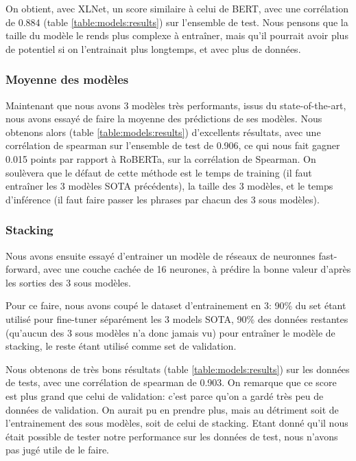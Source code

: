 \documentclass[11pt,a4paper, french]{article}
\begin{document}
On obtient, avec XLNet, un score similaire à celui de BERT, avec une corrélation de 0.884 (table \ref{table:models:results}) sur l'ensemble de test. Nous pensons que la taille du modèle le rends plus complexe à entraîner, mais qu'il pourrait avoir plus de potentiel si on l'entrainait plus longtemps, et avec plus de données.

%
\subsubsection{Moyenne des modèles}

Maintenant que nous avons 3 modèles très performants, issus du state-of-the-art, nous avons essayé de faire la moyenne des prédictions de ses modèles. Nous obtenons alors (table \ref{table:models:results}) d'excellents résultats, avec une corrélation de spearman sur l'ensemble de test de 0.906, ce qui nous fait gagner 0.015 points par rapport à RoBERTa, sur la corrélation de Spearman. On soulèvera que le défaut de cette méthode est le temps de training (il faut entraîner les 3 modèles SOTA précédents), la taille des 3 modèles, et le temps d'inférence (il faut faire passer les phrases par chacun des 3 sous modèles).

%
\subsubsection{Stacking}

Nous avons ensuite essayé d'entrainer un modèle de réseaux de neuronnes fast-forward, avec une couche cachée de 16 neurones, à prédire la bonne valeur d'après les sorties des 3 sous modèles.

Pour ce faire, nous avons coupé le dataset d'entrainement en 3: 90\% du set étant utilisé pour fine-tuner séparément les 3 models SOTA, 90\% des données restantes (qu'aucun des 3 sous modèles n'a donc jamais vu) pour entraîner le modèle de stacking, le reste étant utilisé comme set de validation.

Nous obtenons de très bons résultats (table \ref{table:models:results}) sur les données de tests, avec une corrélation de spearman de 0.903. On remarque que ce score est plus grand que celui de validation: c'est parce qu'on a gardé très peu de données de validation. On aurait pu en prendre plus, mais au détriment soit de l'entrainement des sous modèles, soit de celui de stacking. Etant donné qu'il nous était possible de tester notre performance sur les données de test, nous n'avons pas jugé utile de le faire.
\end{document}
